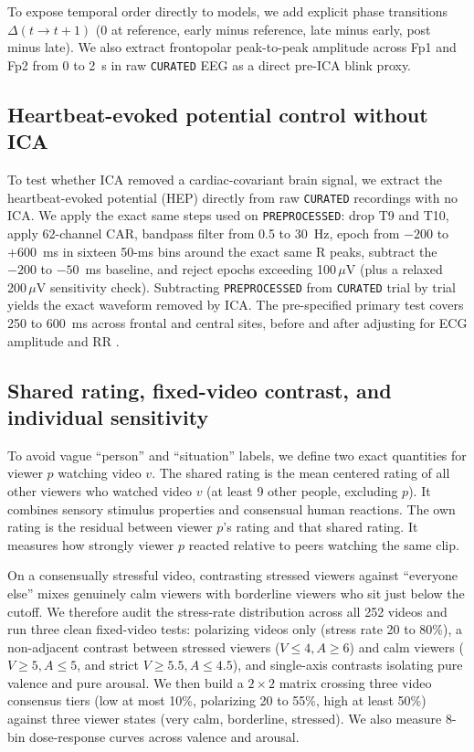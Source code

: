 \documentclass[10pt]{article}
\begin{document}
To expose temporal order directly to models, we add explicit phase transitions $\Delta(t\to t+1)$ (0 at reference, early minus reference, late minus early, post minus late). We also extract frontopolar peak-to-peak amplitude across Fp1 and Fp2 from 0 to 2~s in raw \texttt{CURATED} EEG as a direct pre-ICA blink proxy.

\subsection{Heartbeat-evoked potential control without ICA}

To test whether ICA removed a cardiac-covariant brain signal, we extract the heartbeat-evoked potential (HEP) directly from raw \texttt{CURATED} recordings with no ICA. We apply the exact same steps used on \texttt{PREPROCESSED}: drop T9 and T10, apply 62-channel CAR, bandpass filter from 0.5 to 30~Hz, epoch from $-200$ to $+600$~ms in sixteen 50-ms bins around the exact same R peaks, subtract the $-200$ to $-50$~ms baseline, and reject epochs exceeding 100\,$\mu$V (plus a relaxed 200\,$\mu$V sensitivity check). Subtracting \texttt{PREPROCESSED} from \texttt{CURATED} trial by trial yields the exact waveform removed by ICA. The pre-specified primary test covers 250 to 600~ms across frontal and central sites, before and after adjusting for ECG amplitude and RR \cite{parkblanke2019}.

\subsection{Shared rating, fixed-video contrast, and individual sensitivity}

To avoid vague ``person'' and ``situation'' labels, we define two exact quantities for viewer $p$ watching video $v$. The shared rating is the mean centered rating of all other viewers who watched video $v$ (at least 9 other people, excluding $p$). It combines sensory stimulus properties and consensual human reactions. The own rating is the residual between viewer $p$'s rating and that shared rating. It measures how strongly viewer $p$ reacted relative to peers watching the same clip.

On a consensually stressful video, contrasting stressed viewers against ``everyone else'' mixes genuinely calm viewers with borderline viewers who sit just below the cutoff. We therefore audit the stress-rate distribution across all 252 videos and run three clean fixed-video tests: polarizing videos only (stress rate 20 to 80\%), a non-adjacent contrast between stressed viewers ($V \le 4, A \ge 6$) and calm viewers ($V \ge 5, A \le 5$, and strict $V \ge 5.5, A \le 4.5$), and single-axis contrasts isolating pure valence and pure arousal. We then build a $2 \times 2$ matrix crossing three video consensus tiers (low at most 10\%, polarizing 20 to 55\%, high at least 50\%) against three viewer states (very calm, borderline, stressed). We also measure 8-bin dose-response curves across valence and arousal.
\end{document}
